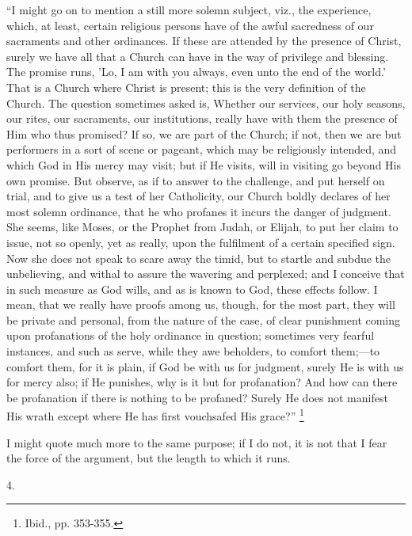 ``I might go on to mention a still more solemn subject, viz.,
the experience, which, at least, certain religious persons have of the
awful sacredness of our sacraments and other ordinances. If these are
attended by the presence of Christ, surely we have all that a Church
can have in the way of privilege and blessing. The promise runs, 'Lo,
I am with you always, even unto the end of the world.' That is a
Church where Christ is present; this is the very definition of the
Church. The question sometimes asked is, Whether our services, our
holy seasons, our rites, our sacraments, our institutions, really have
with them the presence of Him who thus promised? If so, we are part of
the Church; if not, then we are but performers in a sort of scene or
pageant, which may be religiously intended, and which God in His mercy
may visit; but if He visits, will in visiting go beyond His own
promise. But observe, as if to answer to the challenge, and put
herself on trial, and to give us a test of her Catholicity, our Church
boldly declares of her most solemn ordinance, that he who profanes it
incurs the danger of judgment. She seems, like Moses, or the Prophet
from Judah, or Elijah, to put her claim to issue, not so openly, yet
as really, upon the fulfilment of a certain specified sign. Now she
does not speak to scare away the timid, but to startle and subdue the
unbelieving, and withal to assure the wavering and perplexed; and I
conceive that in such measure as God wills, and as is known to God,
these effects follow. I mean, that we really have proofs among us,
though, for the most part, they will be private and personal, from the
nature of the case, of clear punishment coming upon profanations of
the holy ordinance in question; sometimes very fearful instances, and
such as serve, while they awe beholders, to comfort them;—to comfort
them, for it is plain, if God be with us for judgment, surely He is
with us for mercy also; if He punishes, why is it but for profanation?
And how can there be profanation if there is nothing to be profaned?
Surely He does not manifest His wrath except where He has first
vouchsafed His grace?'' \footnote{Ibid., pp. 353-355.}

I might quote much more to the same purpose; if I do not, it is not
that I fear the force of the argument, but the length to which it
runs.

4.

